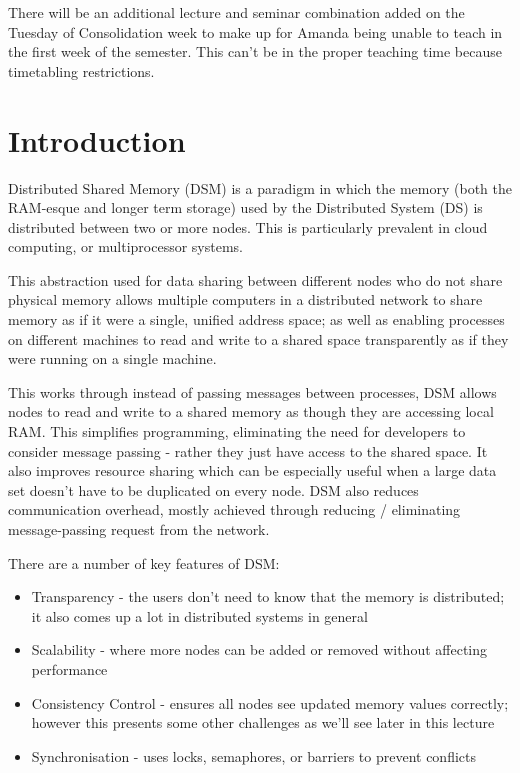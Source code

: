 
There will be an additional lecture and seminar combination added on the Tuesday of Consolidation week to make up for Amanda being unable to teach in the first week of the semester. This can't be in the proper teaching time because timetabling restrictions.

\section{Introduction}
Distributed Shared Memory (DSM) is a paradigm in which the memory (both the RAM-esque and longer term storage) used by the Distributed System (DS) is distributed between two or more nodes. This is particularly prevalent in cloud computing, or multiprocessor systems. 

This abstraction used for data sharing between different nodes who do not share physical memory allows multiple computers in a distributed network to share memory as if it were a single, unified address space; as well as enabling processes on different machines to read and write to a shared space transparently as if they were running on a single machine. 

This works through instead of passing messages between processes, DSM allows nodes to read and write to a shared memory as though they are accessing local RAM. This simplifies programming, eliminating the need for developers to consider message passing - rather they just have access to the shared space. It also improves resource sharing which can be especially useful when a large data set doesn't have to be duplicated on every node. DSM also reduces communication overhead, mostly achieved through reducing / eliminating message-passing request from the network. 

There are a number of key features of DSM:
\begin{itemize}
    \item Transparency - the users don't need to know that the memory is distributed; it also comes up a lot in distributed systems in general
    \item Scalability - where more nodes can be added or removed without affecting performance
    \item Consistency Control - ensures all nodes see updated memory values correctly; however this presents some other challenges as we'll see later in this lecture
    \item Synchronisation - uses locks, semaphores, or barriers to prevent conflicts
\end{itemize}

